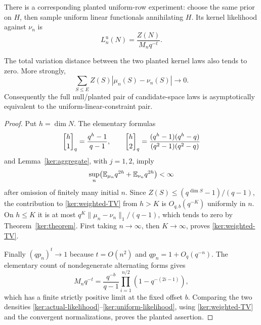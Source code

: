 There is a corresponding planted uniform-row experiment: choose
the same prior on $H$, then sample uniform linear functionals
annihilating $H$.  Its kernel likelihood against $\nu_n$ is
\begin{equation}
 L_n^{\mathrm u}(N)=\frac{Z(N)}{M_nq^{-t}}.
 \label{ker:uniform-likelihood}
\end{equation}

\begin{proposition}
\label{ker:planted-transfer}
The total variation distance between the two planted kernel laws
also tends to zero.  More strongly,
\begin{equation}
 \sum_{S\le E}Z(S)|\mu_n(S)-\nu_n(S)|\longrightarrow0.
 \label{ker:weighted-TV}
\end{equation}
Consequently the full null/planted pair of candidate-space laws is
asymptotically equivalent to the uniform-linear-constraint pair.
\end{proposition}

\begin{proof}
Put $h=\dim N$.  The elementary formulas
\[
 \qbinom h1=\frac{q^h-1}{q-1},\qquad
 \qbinom h2=\frac{(q^h-1)(q^h-q)}{(q^2-1)(q^2-q)}
\]
and Lemma~\ref{ker:aggregate}, with $j=1,2$, imply
\[
 \sup_n\bigl(\mathbb E_{\mu_n}q^{2h}+\mathbb E_{\nu_n}q^{2h}\bigr)<\infty
\]
after omission of finitely many initial $n$.  Since
$Z(S)\le(q^{\dim S}-1)/(q-1)$, the contribution to
\eqref{ker:weighted-TV} from $h>K$ is $O_{q,b}(q^{-K})$ uniformly
in $n$.  On $h\le K$ it is at most
$q^K\|\mu_n-\nu_n\|_1/(q-1)$, which tends to zero by
Theorem~\ref{ker:theorem}.  First taking $n\to\infty$, then
$K\to\infty$, proves \eqref{ker:weighted-TV}.

Finally $(qp_n)^t\to1$ because $t=O(n^2)$ and
$qp_n=1+O_q(q^{-n})$.  The elementary count of nondegenerate alternating
forms gives
\[
 M_nq^{-t}=\frac{q^{-b}}{q-1}
     \prod_{i=1}^{n/2}(1-q^{-(2i-1)}),
\]
which has a finite strictly positive limit at the fixed offset $b$.
Comparing the two densities
\eqref{ker:actual-likelihood}--\eqref{ker:uniform-likelihood}, using
\eqref{ker:weighted-TV} and the convergent normalizations, proves
the planted assertion.
\end{proof}

